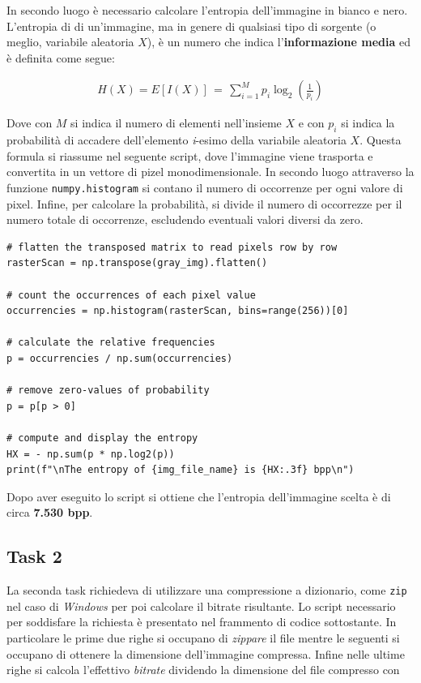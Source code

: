 \FloatBarrier\noindent In secondo luogo è necessario calcolare l'entropia dell'immagine in bianco e nero. L'entropia di di un'immagine, ma in genere di qualsiasi tipo di sorgente (o meglio, variabile aleatoria $X$), è un numero che indica l'\textbf{informazione media} ed è definita come segue:

\begin{gather*}
    H(X) = E[I(X)] \, = \, \sum_{i = 1}^M p_i\log_2\left( \frac{1}{p_i} \right)
\end{gather*}

\noindent Dove con $M$ si indica il numero di elementi nell'insieme $X$ e con $p_i$ si indica la probabilità di accadere dell'elemento \textit{i}-esimo della variabile aleatoria $X$. Questa formula si riassume nel seguente script, dove l'immagine viene trasporta e convertita in un vettore di pizel monodimensionale. In secondo luogo attraverso la funzione \texttt{numpy.histogram} si contano il numero di occorrenze per ogni valore di pixel. Infine, per calcolare la probabilità, si divide il numero di occorrezze per il numero totale di occorrenze, escludendo eventuali valori diversi da zero.


\begin{lstlisting}
# flatten the transposed matrix to read pixels row by row
rasterScan = np.transpose(gray_img).flatten()

# count the occurrences of each pixel value
occurrencies = np.histogram(rasterScan, bins=range(256))[0]

# calculate the relative frequencies
p = occurrencies / np.sum(occurrencies)

# remove zero-values of probability
p = p[p > 0]

# compute and display the entropy
HX = - np.sum(p * np.log2(p))
print(f"\nThe entropy of {img_file_name} is {HX:.3f} bpp\n")
\end{lstlisting}

\noindent Dopo aver eseguito lo script si ottiene che l'entropia dell'immagine scelta è di circa \textbf{7.530 bpp}.


\subsection*{Task 2}
La seconda task richiedeva di utilizzare una compressione a dizionario, come \texttt{zip} nel caso di \textsl{Windows} per poi calcolare il bitrate risultante. Lo script necessario per soddisfare la richiesta è presentato nel frammento di codice sottostante. In particolare le prime due righe si occupano di \textsl{zippare} il file mentre le seguenti si occupano di ottenere la dimensione dell'immagine compressa. Infine nelle ultime righe si calcola l'effettivo \textsl{bitrate} dividendo la dimensione del file compresso con 

